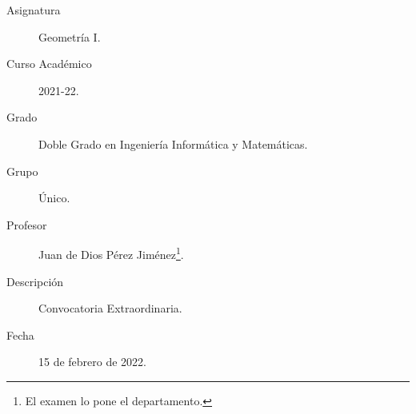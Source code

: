 \documentclass[12pt]{article}
\begin{document}

    
    

    \begin{description}
        \item[Asignatura] Geometría I.
        \item[Curso Académico] 2021-22.
        \item[Grado] Doble Grado en Ingeniería Informática y Matemáticas.
        \item[Grupo] Único.
        \item[Profesor] Juan de Dios Pérez Jiménez\footnote{El examen lo pone el departamento.}.
        \item[Descripción] Convocatoria Extraordinaria.
        \item[Fecha] 15 de febrero de 2022.
    
    \end{description}
    \newpage
\end{document}
